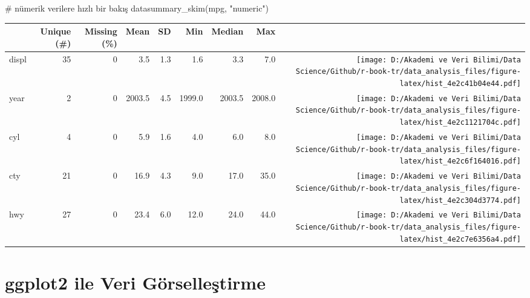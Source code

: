 \documentclass[
  letterpaper,
  DIV=11,
  numbers=noendperiod]{scrreprt}
\newenvironment{Shaded}{\begin{snugshade}}{\end{snugshade}}
\newcommand{\CommentTok}[1]{\textcolor[rgb]{0.37,0.37,0.37}{#1}}
\newcommand{\FunctionTok}[1]{\textcolor[rgb]{0.28,0.35,0.67}{#1}}
\newcommand{\NormalTok}[1]{\textcolor[rgb]{0.00,0.23,0.31}{#1}}
\newcommand{\StringTok}[1]{\textcolor[rgb]{0.13,0.47,0.30}{#1}}
\begin{document}
\begin{Shaded}
\begin{Highlighting}[]
\CommentTok{\# nümerik verilere hızlı bir bakış}
\FunctionTok{datasummary\_skim}\NormalTok{(mpg, }\StringTok{"numeric"}\NormalTok{)}
\end{Highlighting}
\end{Shaded}

\begin{table}
\centering
\begin{tabular}[t]{lrrrrrrr>{}r}
\toprule
  & Unique (\#) & Missing (\%) & Mean & SD & Min & Median & Max &   \\
\midrule
displ & 35 & 0 & \num{3.5} & \num{1.3} & \num{1.6} & \num{3.3} & \num{7.0} & \texttt{[image: D:/Akademi ve Veri Bilimi/Data Science/Github/r-book-tr/data\_analysis\_files/figure-latex/hist\_4e2c41b04e44.pdf]}\\
year & 2 & 0 & \num{2003.5} & \num{4.5} & \num{1999.0} & \num{2003.5} & \num{2008.0} & \texttt{[image: D:/Akademi ve Veri Bilimi/Data Science/Github/r-book-tr/data\_analysis\_files/figure-latex/hist\_4e2c1121704c.pdf]}\\
cyl & 4 & 0 & \num{5.9} & \num{1.6} & \num{4.0} & \num{6.0} & \num{8.0} & \texttt{[image: D:/Akademi ve Veri Bilimi/Data Science/Github/r-book-tr/data\_analysis\_files/figure-latex/hist\_4e2c6f164016.pdf]}\\
cty & 21 & 0 & \num{16.9} & \num{4.3} & \num{9.0} & \num{17.0} & \num{35.0} & \texttt{[image: D:/Akademi ve Veri Bilimi/Data Science/Github/r-book-tr/data\_analysis\_files/figure-latex/hist\_4e2c304d3774.pdf]}\\
hwy & 27 & 0 & \num{23.4} & \num{6.0} & \num{12.0} & \num{24.0} & \num{44.0} & \texttt{[image: D:/Akademi ve Veri Bilimi/Data Science/Github/r-book-tr/data\_analysis\_files/figure-latex/hist\_4e2c7e6356a4.pdf]}\\
\bottomrule
\end{tabular}
\end{table}


\chapter*{ggplot2 ile Veri
Görselleştirme}\label{ggplot2-ile-veri-guxf6rselleux15ftirme}

\end{document}
